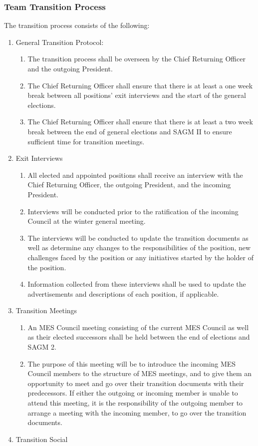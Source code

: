 \subsubsection{Team Transition Process}
\label{team-transition-process}

The transition process consists of the following:

\begin{enumerate}
 \item
  General Transition Protocol:

  \begin{enumerate}
   \item
    The transition process shall be overseen by the Chief Returning Officer and the outgoing President.
   \item
    The Chief Returning Officer shall ensure that there is at least a one week break between all positions' exit interviews and the start of the general elections.
   \item
    The Chief Returning Officer shall ensure that there is at least a two week break between the end of general elections and SAGM II to ensure sufficient time for transition meetings.
  \end{enumerate}
 \item
  Exit Interviews

  \begin{enumerate}
   \item
    All elected and appointed positions shall receive an interview with the Chief Returning Officer, the outgoing President, and the incoming President.
   \item
    Interviews will be conducted prior to the ratification of the incoming Council at the winter general meeting.
   \item
    The interviews will be conducted to update the transition documents as well as determine any changes to the responsibilities of the position, new challenges faced by the position or any initiatives started by the holder of the position.
   \item
    Information collected from these interviews shall be used to update the advertisements and descriptions of each position, if applicable.
  \end{enumerate}
 \item
  Transition Meetings

  \begin{enumerate}
   \item
    An MES Council meeting consisting of the current MES Council as well as their elected successors shall be held between the end of elections and SAGM 2.
   \item
    The purpose of this meeting will be to introduce the incoming MES Council members to the structure of MES meetings, and to give them an opportunity to meet and go over their transition documents with their predecessors. If either the outgoing or incoming member is unable to attend this meeting, it is the responsibility of the outgoing member to arrange a meeting with the incoming member, to go over the transition documents.
  \end{enumerate}
 \item
  Transition Social


\end{enumerate}
